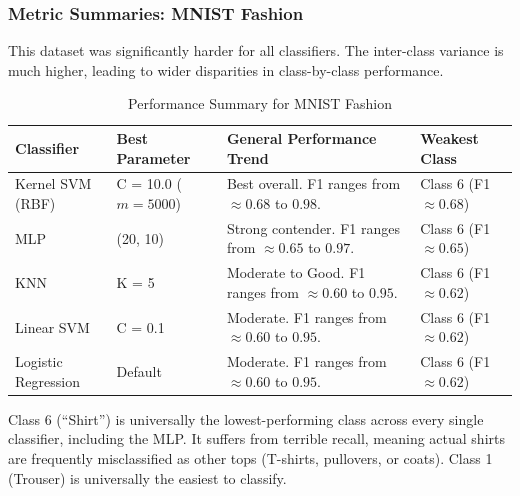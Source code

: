 \documentclass[twoside, 10pt]{article}
\begin{document}
\subsubsection{Metric Summaries: MNIST Fashion}
This dataset was significantly harder for all classifiers. The inter-class variance is much higher, leading to wider disparities in class-by-class performance.
\begin{table}[H]
    \centering
    \begin{tabularx}{\textwidth}{l l X l}
        \toprule
        \textbf{Classifier} & \textbf{Best Parameter} & \textbf{General Performance Trend} & \textbf{Weakest Class} \\
        \midrule
        Kernel SVM (RBF) & C = 10.0 ($m=5000$) & Best overall. F1 ranges from $\approx 0.68$ to $0.98$. & Class 6 (F1 $\approx 0.68$) \\
        MLP & (20, 10) & Strong contender. F1 ranges from $\approx 0.65$ to $0.97$. & Class 6 (F1 $\approx 0.65$) \\
        KNN & K = 5 & Moderate to Good. F1 ranges from $\approx 0.60$ to $0.95$. & Class 6 (F1 $\approx 0.62$) \\
        Linear SVM & C = 0.1 & Moderate. F1 ranges from $\approx 0.60$ to $0.95$. & Class 6 (F1 $\approx 0.62$) \\
        Logistic Regression & Default & Moderate. F1 ranges from $\approx 0.60$ to $0.95$. & Class 6 (F1 $\approx 0.62$) \\
        \bottomrule
    \end{tabularx}
    \caption{Performance Summary for MNIST Fashion}
\end{table}
\noindent Class 6 (``Shirt'') is universally the lowest-performing class across every single classifier, including the MLP. It suffers from terrible recall, meaning actual shirts are frequently misclassified as other tops (T-shirts, pullovers, or coats). Class 1 (Trouser) is universally the easiest to classify.
\end{document}
